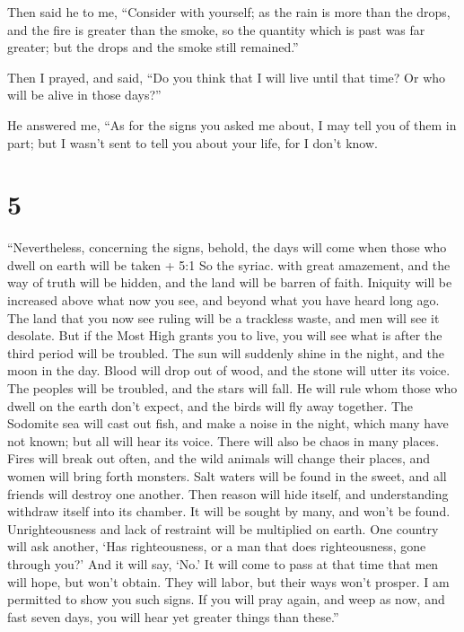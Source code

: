  Then said he to me, ``Consider with yourself; as the rain
is more than the drops, and the fire is greater than the smoke, so the
quantity which is past was far greater; but the drops and the smoke
still remained.''

 Then I prayed, and said, ``Do you think that I will live
until that time? Or who will be alive in those days?''

 He answered me, ``As for the signs you asked me about, I
may tell you of them in part; but I wasn't sent to tell you about your
life, for I don't know.

\hypertarget{section-4}{%
\section{5}\label{section-4}}

 ``Nevertheless, concerning the signs, behold, the days will
come when those who dwell on earth will be taken + 5:1 So the syriac.
with great amazement, and the way of truth will be hidden, and the land
will be barren of faith.  Iniquity will be increased above
what now you see, and beyond what you have heard long ago. 
The land that you now see ruling will be a trackless waste, and men will
see it desolate.  But if the Most High grants you to live,
you will see what is after the third period will be troubled. The sun
will suddenly shine in the night, and the moon in the day. 
Blood will drop out of wood, and the stone will utter its voice. The
peoples will be troubled, and the stars will fall.  He will
rule whom those who dwell on the earth don't expect, and the birds will
fly away together.  The Sodomite sea will cast out fish, and
make a noise in the night, which many have not known; but all will hear
its voice.  There will also be chaos in many places. Fires
will break out often, and the wild animals will change their places, and
women will bring forth monsters.  Salt waters will be found
in the sweet, and all friends will destroy one another. Then reason will
hide itself, and understanding withdraw itself into its chamber.
 It will be sought by many, and won't be found.
Unrighteousness and lack of restraint will be multiplied on earth.
 One country will ask another, `Has righteousness, or a man
that does righteousness, gone through you?' And it will say, `No.'
 It will come to pass at that time that men will hope, but
won't obtain. They will labor, but their ways won't prosper.
 I am permitted to show you such signs. If you will pray
again, and weep as now, and fast seven days, you will hear yet greater
things than these.''

